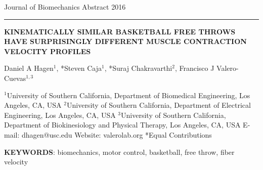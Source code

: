 \documentclass[12pt]{article}
\begin{document}
\vspace*{-25mm}
\centerline{\small Journal of Biomechanics Abstract 2016}
\vspace{1mm}\hrule\vspace{12pt}
%
\vspace{10mm}
{\centering \large \bf
KINEMATICALLY SIMILAR BASKETBALL FREE THROWS HAVE SURPRISINGLY DIFFERENT MUSCLE CONTRACTION VELOCITY PROFILES \par}

\vspace{3mm}
\normalsize \rm
\centerline{Daniel A Hagen$^1$, *Steven Caja$^1$, *Suraj Chakravarthi$^2$, Francisco J Valero-Cuevas$^{1,3}$}
\normalsize 

\vspace{3mm}

{
\centering
$^1$University of Southern California, Department of Biomedical Engineering, Los Angeles, CA, USA \break
$^2$University of Southern California, Department of Electrical Engineering, Los Angeles, CA, USA \break
$^3$University of Southern California, Department of Biokinesiology and Physical Therapy, Los Angeles, CA, USA \break
E-mail: dhagen@usc.edu Website: valerolab.org \break
*Equal Contributions\break\par
}

\vspace{3mm}

\textbf{KEYWORDS}: biomechanics, motor control, basketball, free throw, fiber velocity

\vspace{3mm}
\end{document}
